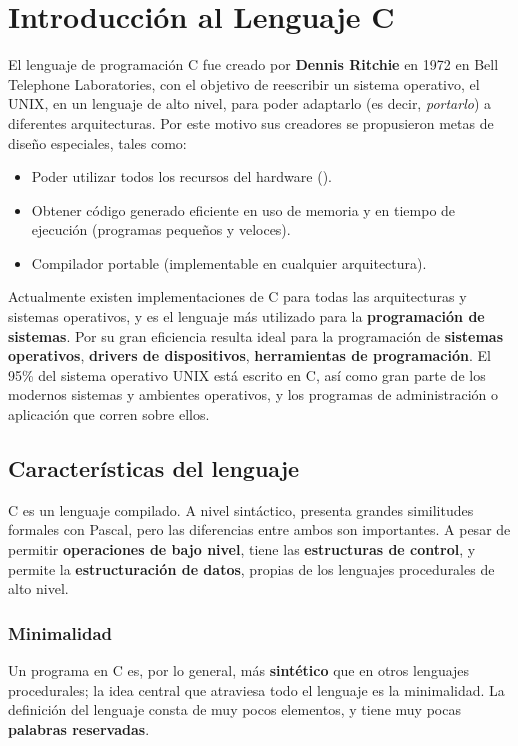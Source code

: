 
\chapter{Introducción al Lenguaje C}


El lenguaje de programación C fue creado por \textbf{Dennis Ritchie} en 1972 en
Bell Telephone Laboratories, con el objetivo de reescribir un sistema
operativo, el UNIX, en un lenguaje de alto nivel, para poder adaptarlo
(es decir, \textit{portarlo}) a diferentes arquitecturas. Por este motivo sus
creadores se propusieron metas de diseño especiales, tales como: 

\begin{itemize}
\item Poder utilizar todos los recursos del hardware (). 
\item Obtener código generado eficiente en uso de memoria y en tiempo de ejecución (programas pequeños y veloces).
\item Compilador portable (implementable en cualquier arquitectura).
\end{itemize}


Actualmente existen implementaciones de C para todas las arquitecturas y
sistemas operativos, y es el lenguaje más utilizado para la
\textbf{programación de sistemas}. Por su gran eficiencia resulta ideal para
la programación de \textbf{sistemas operativos}, \textbf{drivers de dispositivos},
\textbf{herramientas de programación}. El 95\% del sistema operativo UNIX
está escrito en C, así como gran parte de los modernos
sistemas y ambientes operativos, y los programas de administración o aplicación que corren
sobre ellos.


\section{Características del lenguaje}
C es un lenguaje compilado. A nivel sintáctico, presenta grandes
similitudes formales con Pascal, pero las diferencias entre ambos son
importantes. A pesar de permitir \textbf{operaciones de bajo nivel}, tiene las
\textbf{estructuras de control}, y permite la \textbf{estructuración de datos}, propias
de los lenguajes procedurales de alto nivel. 

\subsection{Minimalidad}
Un programa en C es, por lo general, más \textbf{sintético} que en otros
lenguajes procedurales; la idea central que atraviesa todo
el lenguaje es la minimalidad. La definición del lenguaje consta de
muy pocos elementos, y tiene muy pocas \textbf{palabras reservadas}. 

